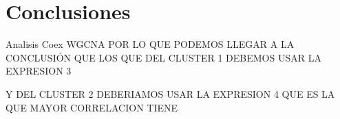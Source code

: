 \section{Conclusiones}

Analisis Coex WGCNA
POR LO QUE PODEMOS LLEGAR A LA CONCLUSIÓN QUE LOS QUE DEL CLUSTER 1 DEBEMOS USAR LA EXPRESION 3 

Y DEL CLUSTER 2 DEBERIAMOS USAR LA EXPRESION 4 QUE ES LA QUE MAYOR CORRELACION TIENE
